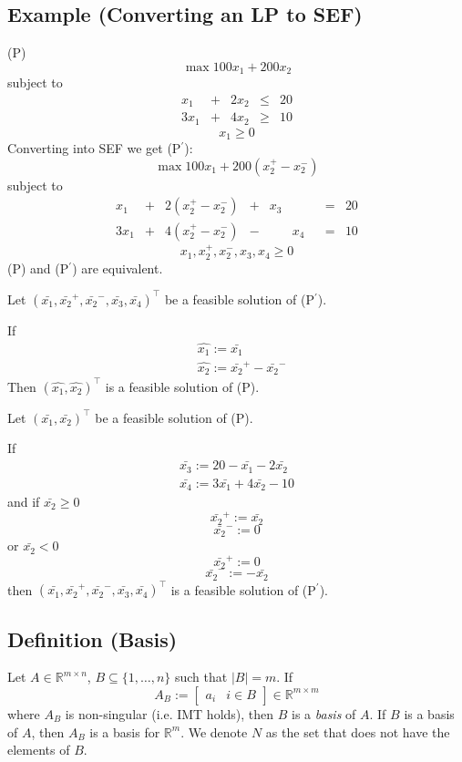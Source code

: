\subsection{Example (Converting an LP to SEF)}
(P)
\[\max 100x_1+200x_2\]
subject to
\[
\begin{array}{ccccc}
    x_1 & + & 2x_2 & \le & 20\\
    3x_1 & + & 4x_2 & \ge & 10
\end{array}
\]
\[x_1 \ge 0\]
Converting into SEF we get (P$^\prime$):
\[\max 100x_1+200(x_2^+-x_2^-)\]
subject to
\[
\begin{array}{ccccccccc}
    x_1 & + & 2(x_2^+-x_2^-) & + & x_3 & & & = & 20\\
    3x_1 & + & 4(x_2^+-x_2^-) & - & & x_4 & & = & 10
\end{array}
\]
\[x_1,x_2^+,x_2^-,x_3,x_4\ge 0\]
(P) and (P$^\prime$) are equivalent.

Let
$(\bar{x_1}, \bar{x_2}^+, \bar{x_2}^-, \bar{x_3}, \bar{x_4})^\top$
be a feasible solution of (P$^\prime$).


If
\begin{align*}
    &\hat{x_1}:=\bar{x_1}\\
    &\hat{x_2}:=\bar{x_2}^+-\bar{x_2}^-
\end{align*}
Then 
$(\hat{x_1},\hat{x_2})^\top$
is a feasible solution of (P).

Let
$(\bar{x_1}, \bar{x_2})^\top$
be a feasible solution of (P).

If
\begin{align*}
    \bar{x_3}:=20-\bar{x_1}-2\bar{x_2}\\
    \bar{x_4}:=3\bar{x_1}+4\bar{x_2}-10
\end{align*}
and 
if $\bar{x_2}\ge 0$
\[\bar{x_2}^+:=\bar{x_2}\]
\[\bar{x_2}^-:=0\]
or $\bar{x_2}< 0$
\[\bar{x_2}^+:=0\]
\[\bar{x_2}^-:=-\bar{x_2}\]
then $(\bar{x_1},\bar{x_2}^+,\bar{x_2}^-,\bar{x_3},\bar{x_4})^\top$
is a feasible solution of (P$^\prime$).

\begin{defbox}
    \subsection{Definition (Basis)}
    Let $A\in \mathbb{R}^{m\times n}$, $B\subseteq\{1,\dots,n\}$ such that $|B|=m$. If
    \[A_B:= \left[\begin{array}{c|c} a_i & i\in B \end{array}\right]
        \in \mathbb{R}^{m\times m}
    \]
    where $A_B$ is non-singular (i.e. IMT holds), then $B$ is a \emph{basis} of $A$.
    If $B$ is a basis of $A$, then $A_B$ is a basis for $\mathbb{R}^m$. We
    denote $N$ as the set that does not have the elements of $B$.
\end{defbox}

